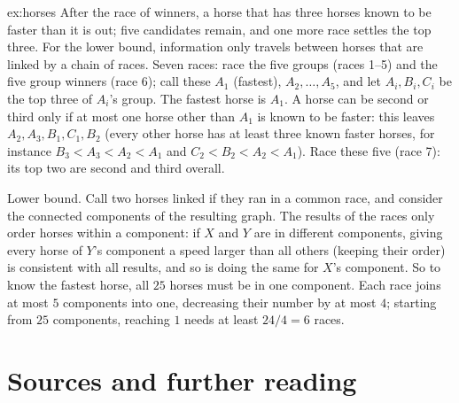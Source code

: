 \begin{solution}{ex:horses}
\idea After the race of winners, a horse that has three horses known to be faster than it is out; five candidates remain, and one more race settles the top three. For the lower bound, information
only travels between horses that are linked by a chain of races.
\writeup Seven races: race the five groups (races 1--5) and the five group winners (race 6); call these $A_1$ (fastest), $A_2,\dots,A_5$, and let $A_i,B_i,C_i$ be the top three of $A_i$'s group. The fastest
horse is $A_1$. A horse can be second or third only if at most one horse other than $A_1$ is known to be faster: this leaves $A_2,A_3,B_1,C_1,B_2$ (every other horse has at least three known faster
horses, for instance $B_3<A_3<A_2<A_1$ and $C_2<B_2<A_2<A_1$). Race these five (race 7): its top two are second and third overall.

Lower bound. Call two horses linked if they ran in a common race, and consider the connected components of the resulting graph. The results of the races only order horses within a component: if
$X$ and $Y$ are in different components, giving every horse of $Y$'s component a speed larger than all others (keeping their order) is consistent with all results, and so is doing the same for
$X$'s component. So to know the fastest horse, all $25$ horses must be in one component. Each race joins at most $5$ components into one, decreasing their number by at most $4$; starting from $25$
components, reaching $1$ needs at least $24/4=6$ races.
\end{solution}

\section*{Sources and further reading}

